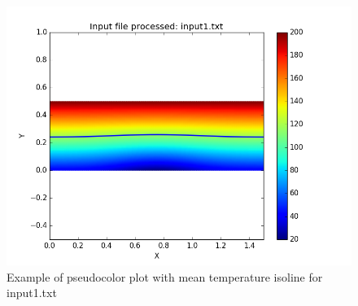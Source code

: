 \documentclass{article}
\begin{document}
\begin{figure}[H]
\centering
\includegraphics[scale=0.6]{pcolor1.png}
\caption{Example of pseudocolor plot with mean temperature isoline for input1.txt}
\label{fig:pcolor1}
\end{figure}



\end{document}

